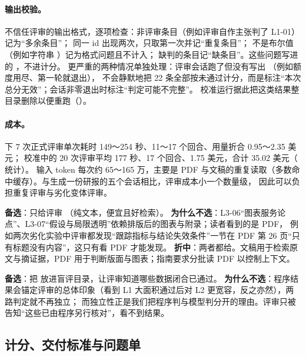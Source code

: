 \paragraph{输出校验。}
 不信任评审的输出格式，逐项检查：非评审条目（例如评审自作主张判了 L1-01）记为“多余条目”；
同一 id 出现两次，只取第一次并记“重复条目”； 不是布尔值（例如字符串 ）记为格式问题且不计入；
缺判的条目记“缺条目”。这些问题写进  的 ，不进计分。
更严重的两种情况单独处理：评审会话跑了但没有写出 （例如额度用尽、第一轮就退出），
 不会静默地把 22 条全部按未通过计分，而是标注“本次总分无效”；会话非零退出时标注“判定可能不完整”。
校准运行据此把这类结果整目录删除以便重跑（）。

\paragraph{成本。}
 下 7 次正式评审单次耗时 149～254 秒、11～17 个回合、用量折合 0.95～2.35 美元；
校准中的 20 次评审平均 177 秒、17 个回合、1.75 美元，合计 35.02 美元（ 统计）。
输入 token 每次约 65～165 万，主要是 PDF 与文稿的重复读取（多数命中缓存）。与生成一份研报的五个会话相比，评审成本小一个数量级，
因此可以负担重复评审与劣化变体评审。

\begin{tradeoff}
\textbf{备选}：只给评审 （纯文本，便宜且好检索）。
\textbf{为什么不选}：L3-06“图表服务论点”、L3-07“假设与局限透明”依赖排版后的图表与附录；读者看到的是 PDF，
例如两次劣化实验中评审都发现“跟踪指标与结论失效条件”一节在 PDF 第 26 页“只有标题没有内容”，这只有看 PDF 才能发现。
\textbf{折中}：两者都给。文稿用于检索原文与摘证据，PDF 用于判断版面与图表；指南要求分批读 PDF 以控制上下文。
\end{tradeoff}

\begin{tradeoff}[：让评审看到程序检查结果吗]
\textbf{备选}：把  放进盲评目录，让评审知道哪些数据闭合已通过。
\textbf{为什么不选}：程序结果会锚定评审的总体印象（看到 L1 大面积通过后对 L2 更宽容，反之亦然），两路判定就不再独立；
而独立性正是我们把程序判与模型判分开的理由。评审只被告知“这些已由程序另行核对”，看不到结果。
\end{tradeoff}

\subsection{计分、交付标准与问题单}
\label{sec:eval-score}

